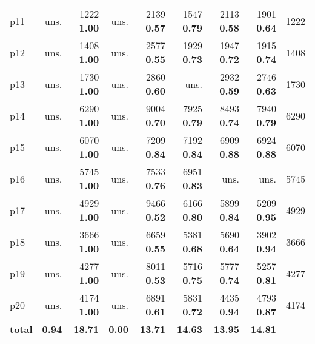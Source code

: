 \begin{tabular}{|l|rrrrrrr|r|}
p11 & uns. & {\footnotesize 1222} \textbf{1.00} & uns. & {\footnotesize 2139} \textbf{0.57} & {\footnotesize 1547} \textbf{0.79} & {\footnotesize 2113} \textbf{0.58} & {\footnotesize 1901} \textbf{0.64} & 1222\\
p12 & uns. & {\footnotesize 1408} \textbf{1.00} & uns. & {\footnotesize 2577} \textbf{0.55} & {\footnotesize 1929} \textbf{0.73} & {\footnotesize 1947} \textbf{0.72} & {\footnotesize 1915} \textbf{0.74} & 1408\\
p13 & uns. & {\footnotesize 1730} \textbf{1.00} & uns. & {\footnotesize 2860} \textbf{0.60} & uns. & {\footnotesize 2932} \textbf{0.59} & {\footnotesize 2746} \textbf{0.63} & 1730\\
p14 & uns. & {\footnotesize 6290} \textbf{1.00} & uns. & {\footnotesize 9004} \textbf{0.70} & {\footnotesize 7925} \textbf{0.79} & {\footnotesize 8493} \textbf{0.74} & {\footnotesize 7940} \textbf{0.79} & 6290\\
p15 & uns. & {\footnotesize 6070} \textbf{1.00} & uns. & {\footnotesize 7209} \textbf{0.84} & {\footnotesize 7192} \textbf{0.84} & {\footnotesize 6909} \textbf{0.88} & {\footnotesize 6924} \textbf{0.88} & 6070\\
p16 & uns. & {\footnotesize 5745} \textbf{1.00} & uns. & {\footnotesize 7533} \textbf{0.76} & {\footnotesize 6951} \textbf{0.83} & uns. & uns. & 5745\\
p17 & uns. & {\footnotesize 4929} \textbf{1.00} & uns. & {\footnotesize 9466} \textbf{0.52} & {\footnotesize 6166} \textbf{0.80} & {\footnotesize 5899} \textbf{0.84} & {\footnotesize 5209} \textbf{0.95} & 4929\\
p18 & uns. & {\footnotesize 3666} \textbf{1.00} & uns. & {\footnotesize 6659} \textbf{0.55} & {\footnotesize 5381} \textbf{0.68} & {\footnotesize 5690} \textbf{0.64} & {\footnotesize 3902} \textbf{0.94} & 3666\\
p19 & uns. & {\footnotesize 4277} \textbf{1.00} & uns. & {\footnotesize 8011} \textbf{0.53} & {\footnotesize 5716} \textbf{0.75} & {\footnotesize 5777} \textbf{0.74} & {\footnotesize 5257} \textbf{0.81} & 4277\\
p20 & uns. & {\footnotesize 4174} \textbf{1.00} & uns. & {\footnotesize 6891} \textbf{0.61} & {\footnotesize 5831} \textbf{0.72} & {\footnotesize 4435} \textbf{0.94} & {\footnotesize 4793} \textbf{0.87} & 4174\\
\hline
\textbf{total} & \textbf{0.94} & \textbf{18.71} & \textbf{0.00} & \textbf{13.71} & \textbf{14.63} & \textbf{13.95} & \textbf{14.81} & \\
\hline
\end{tabular}

